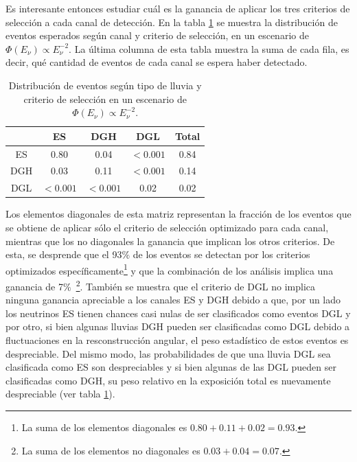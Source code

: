 	Es interesante entonces estudiar cuál es la ganancia de aplicar los tres criterios de selección a cada canal de detección.
	En la tabla \ref{tab:expDist} se muestra la distribución de eventos esperados según canal y criterio de selección, en un escenario de $\Phi(E_\nu)\propto E_\nu^{-2}$.
	La última columna de esta tabla muestra la suma de cada fila, es decir, qué cantidad de eventos de cada canal se espera haber detectado.
	\begin{table}[ht!]
		\begin{center}\renewcommand{\arraystretch}{1.4}
			\begin{tabular}{|c|c|c|c|c|}
			\hline
			\diagbox{Lluvia}{Criterio} & ES & DGH & DGL  & Total\\ \hline
			ES     &    0.80       &    0.04       &     $<0.001$ & 0.84 \\ \hline
			DGH    &    0.03       &    0.11       &     $<0.001$ & 0.14 \\ \hline
			DGL    &    $<0.001$   &    $<0.001$   &     0.02     & 0.02 \\
			\hline
			\end{tabular}
		\end{center}
		
		\caption{\label{tab:expDist}Distribución de eventos según tipo de lluvia y criterio de selección en un escenario de $\Phi(E_\nu)\propto E_\nu^{-2}$. }
	\end{table}
	Los elementos diagonales de esta matriz representan la fracción de los eventos que se obtiene de aplicar sólo el criterio de selección optimizado para cada canal, mientras que los no diagonales la ganancia que implican los otros criterios.
	De esta, se desprende que el 93$\%$ de los eventos se detectan por los criterios optimizados específicamente\footnote{La suma de los elementos diagonales es $0.80+0.11+0.02=0.93$.} y que la combinación de los análisis implica una ganancia de 7$\%$~\footnote{La suma de los elementos no diagonales es $0.03+0.04=0.07$.}.
	También se muestra que el criterio de DGL no implica ninguna ganancia apreciable a los canales ES y DGH debido a que, por un lado los neutrinos ES tienen chances casi nulas de ser clasificados como eventos DGL y por otro, si bien algunas lluvias DGH pueden ser clasificadas como DGL debido a fluctuaciones en la resconstrucción angular, el peso estadístico de estos eventos es despreciable.
	Del mismo modo, las probabilidades de que una lluvia DGL sea clasificada como ES son despreciables y si bien algunas de las DGL pueden ser clasificadas como DGH, su peso relativo en la exposición total es nuevamente despreciable (ver tabla \ref{tab:expDist}).
	

